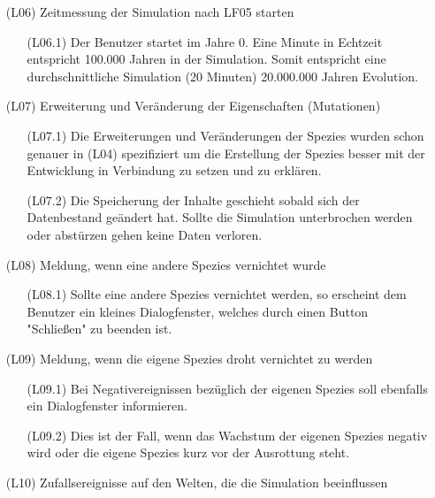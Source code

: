 \documentclass[a4paper, 10pt]{article}
\begin{document}
\begin{enumerate}
\item[(L06)]Zeitmessung der Simulation nach LF05 starten
\begin{enumerate}
\item[(L06.1)]Der Benutzer startet im Jahre 0. Eine Minute in Echtzeit entspricht 100.000 Jahren in der Simulation. Somit entspricht eine durchschnittliche Simulation (20 Minuten) 20.000.000 Jahren Evolution.
\end{enumerate}

\item[(L07)]Erweiterung und Veränderung der Eigenschaften (Mutationen)
\begin{enumerate}
\item[(L07.1)]
Die Erweiterungen und Veränderungen der Spezies wurden schon genauer in (L04) spezifiziert um die Erstellung der Spezies besser mit der Entwicklung in Verbindung zu setzen und zu erklären.
\item[(L07.2)]
Die Speicherung der Inhalte geschieht sobald sich der Datenbestand geändert hat. Sollte die Simulation unterbrochen werden oder abstürzen gehen keine Daten verloren. 
\end{enumerate}

\item[(L08)]Meldung, wenn eine andere Spezies vernichtet wurde
\begin{enumerate}
\item[(L08.1)]Sollte eine andere Spezies vernichtet werden, so erscheint dem Benutzer ein kleines Dialogfenster, welches durch einen Button "Schließen" zu beenden ist. 
\end{enumerate}

\item[(L09)] Meldung, wenn die eigene Spezies droht vernichtet zu werden
\begin{enumerate}
\item[(L09.1)] Bei Negativereignissen bezüglich der eigenen Spezies soll ebenfalls ein Dialogfenster informieren. 
\item[(L09.2)]
Dies ist der Fall, wenn das Wachstum der eigenen Spezies negativ wird oder die eigene Spezies kurz vor der Ausrottung steht.
\end{enumerate}


\item[(L10)] Zufallsereignisse auf den Welten, die die Simulation beeinflussen


\end{enumerate}
\end{document}
